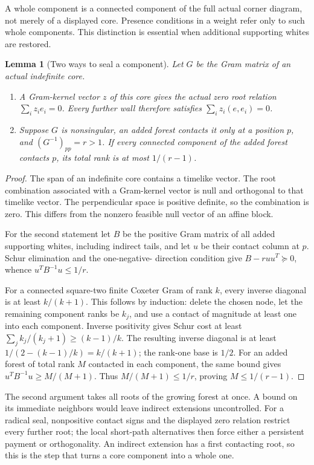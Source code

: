 \documentclass[11pt]{article}
\newtheorem{lemma}[theorem]{Lemma}
\theoremstyle{remark}\newtheorem{remark}[theorem]{Remark}
\begin{document}
A whole component is a connected component of the full actual corner
diagram, not merely of a displayed core. Presence conditions in a weight
refer only to such whole components. This distinction is essential when
additional supporting whites are restored.

\begin{lemma}[Two ways to seal a component]\label{lem:seals}
Let $G$ be the Gram matrix of an actual indefinite core.
\begin{enumerate}
\item A Gram-kernel vector $z$ of this core gives the actual zero
root relation $\sum_i z_i e_i=0$. Every further wall therefore
satisfies $\sum_i z_i(e,e_i)=0$.
\item Suppose $G$ is nonsingular, an added forest contacts it only
at a position $p$, and $(G^{-1})_{pp}=r>1$. If every connected
component of the added forest contacts $p$, its total rank is at
most $1/(r-1)$.
\end{enumerate}
\end{lemma}
\begin{proof}
The span of an indefinite core contains a timelike vector. The root
combination associated with a Gram-kernel vector is null and
orthogonal to that timelike vector. The perpendicular space is
positive definite, so the combination is zero. This differs from
the nonzero feasible null vector of an affine block.

For the second statement let $B$ be the positive Gram matrix of all
added supporting whites, including indirect tails, and let $u$ be
their contact column at $p$. Schur elimination and the one-negative-
direction condition give $B-r uu^T\succeq0$, whence
$u^TB^{-1}u\le1/r$.

For a connected square-two finite Coxeter Gram of rank $k$, every
inverse diagonal is at least $k/(k+1)$. This follows by induction:
delete the chosen node, let the remaining component ranks be $k_j$,
and use a contact of magnitude at least one into each component.
Inverse positivity gives Schur cost at least
$\sum_j k_j/(k_j+1)\ge(k-1)/k$. The resulting inverse diagonal
is at least $1/(2-(k-1)/k)=k/(k+1)$; the rank-one base is $1/2$.
For an added forest of total rank $M$ contacted in each component,
the same bound gives $u^TB^{-1}u\ge M/(M+1)$.
Thus $M/(M+1)\le1/r$, proving $M\le1/(r-1)$.
\end{proof}

The second argument takes all roots of the growing forest at once.
A bound on its immediate neighbors would leave indirect extensions
uncontrolled. For a radical seal, nonpositive contact signs and the
displayed zero relation restrict every further root; the local
short-path alternatives then force either a persistent payment or
orthogonality. An indirect extension has a first contacting root,
so this is the step that turns a core component into a whole one.
\end{document}
